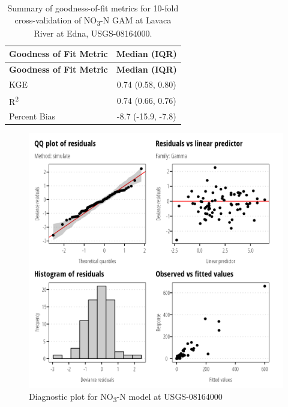 \documentclass[
]{article}
\begin{document}
\hypertarget{tbl-NO308164000-CV}{}
\begin{longtable}[]{@{}lc@{}}
\caption{\label{tbl-NO308164000-CV}Summary of goodness-of-fit metrics
for 10-fold cross-validation of NO\textsubscript{3}-N GAM at Lavaca
River at Edna, USGS-08164000.}\tabularnewline
\toprule()
\textbf{Goodness of Fit Metric} & \textbf{Median (IQR)} \\
\midrule()
\endfirsthead
\toprule()
\textbf{Goodness of Fit Metric} & \textbf{Median (IQR)} \\
\midrule()
\endhead
KGE & 0.74 (0.58, 0.80) \\
R\textsuperscript{2} & 0.74 (0.66, 0.76) \\
Percent Bias & -8.7 (-15.9, -7.8) \\
\bottomrule()
\end{longtable}

\clearpage

\begin{figure}[h]

{\centering \includegraphics{model_assessment_files/figure-pdf/unnamed-chunk-4-1.png}

}

\caption{Diagnostic plot for NO\textsubscript{3}-N model at
USGS-08164000}

\end{figure}
\end{document}
